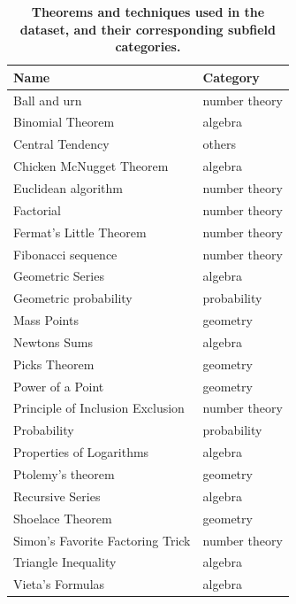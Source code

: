 \begin{table}
\caption{
    \textbf{Theorems and techniques used in the \aops dataset, and their corresponding subfield categories.}
}
\centering
\begin{tabular}{ll}
    \toprule
    Name & Category \\
    \midrule
    Ball and urn & number theory\\
    Binomial Theorem & algebra\\
    Central Tendency & others\\
    Chicken McNugget Theorem & algebra\\
    Euclidean algorithm & number theory\\
    Factorial & number theory\\
    Fermat's Little Theorem & number theory\\
    Fibonacci sequence & number theory\\
    Geometric Series & algebra\\
    Geometric probability & probability\\
    Mass Points & geometry\\
    Newtons Sums & algebra\\
    Picks Theorem & geometry\\
    Power of a Point & geometry\\
    Principle of Inclusion Exclusion & number theory\\
    Probability & probability\\
    Properties of Logarithms & algebra\\
    Ptolemy's theorem & geometry\\
    Recursive Series & algebra\\
    Shoelace Theorem & geometry\\
    Simon's Favorite Factoring Trick & number theory\\
    Triangle Inequality & algebra\\
    Vieta's Formulas & algebra\\
    \bottomrule
\end{tabular}
\label{tab:aops_topics}
\end{table}